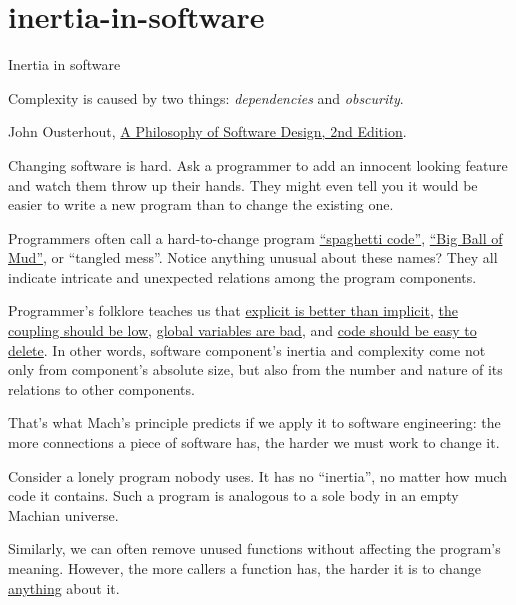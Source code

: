 \documentclass{article}
\begin{document}
\section{inertia-in-software}{Inertia in software}

\epigraph{
  Complexity is caused by two things: \emph{dependencies} and \emph{obscurity}.
}{John Ousterhout, \href{https://www.amazon.com/Philosophy-Software-Design-2nd/dp/173210221X}{A Philosophy of Software Design, 2nd Edition}.}

Changing software is hard.
Ask a programmer to add an innocent looking feature and watch them throw up their hands.
They might even tell you it would be easier to write a new program than to change the existing one.

Programmers often call a hard-to-change program \href{https://en.wikipedia.org/wiki/Spaghetti_code}{``spaghetti code''}, \href{http://laputan.org/mud/}{``Big Ball of Mud''}, or ``tangled mess''.
Notice anything unusual about these names?
They all indicate intricate and unexpected relations among the program components.

Programmer's folklore teaches us that \href{https://peps.python.org/pep-0020/}{explicit is better than implicit}, \href{https://en.wikipedia.org/wiki/Coupling_%28computer_programming%29}{the coupling should be low}, \href{http://wiki.c2.com/?GlobalVariablesAreBad}{global variables are bad}, and \href{https://programmingisterrible.com/post/139222674273/write-code-that-is-easy-to-delete-not-easy-to}{code should be easy to delete}.
In other words, software component's inertia and complexity come not only from component's absolute size, but also from the number and nature of its relations to other components.

That's what Mach's principle predicts if we apply it to software engineering: the more connections a piece of software has, the harder we must work to change it.

Consider a lonely program nobody uses.
It has no ``inertia'', no matter how much code it contains.
Such a program is analogous to a sole body in an empty Machian universe.

Similarly, we can often remove unused functions without affecting the program's meaning.
However, the more callers a function has, the harder it is to change \href{https://www.hyrumslaw.com/}{anything} about it.
\end{document}
